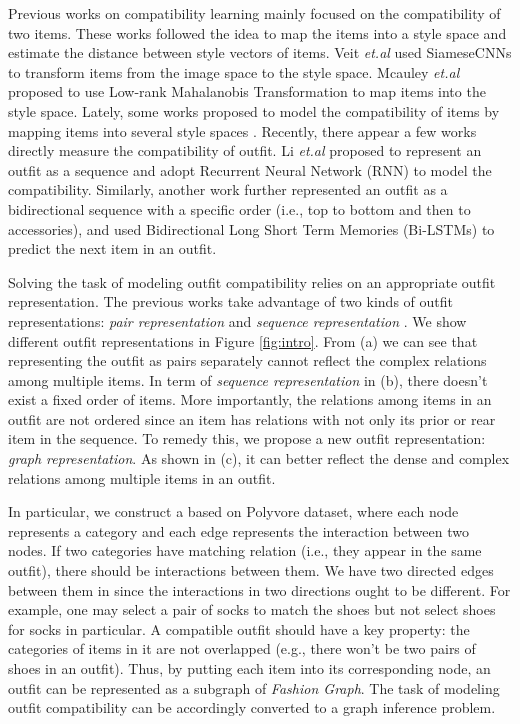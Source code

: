 \documentclass[sigconf]{acmart}
\begin{document}
Previous works on compatibility learning mainly focused on the compatibility of two items. These works followed the idea to map the items into a style space and estimate the distance between style vectors of items.
 Veit \emph{et.al} used SiameseCNNs \cite{veit2015learning,Bell2015Learning} to transform items from the image space to the style space.
Mcauley \emph{et.al} \cite{mcauley2015image} proposed to use Low-rank Mahalanobis Transformation to map items into the style space. Lately, some works proposed to model the compatibility of items by mapping items into several style spaces \cite{he2016learning,shih2018compatibility}.
Recently, there appear a few works directly measure the compatibility of outfit.
Li \emph{et.al} \cite{li2017mining} proposed to represent an outfit as a sequence and adopt Recurrent Neural Network (RNN) \cite{mikolov2010recurrent,mikolov2011extensions,hochreiter1997long,gers1999learning,sundermeyer2012lstm,liu2016predicting,cui2018mv} to model the compatibility.
Similarly, another work \cite{han2017learning} further represented an outfit as a bidirectional sequence with a specific order (i.e., top to bottom and then to accessories), and used Bidirectional Long Short Term Memories (Bi-LSTMs) to predict the next item in an outfit.


Solving the task of modeling outfit compatibility relies on an appropriate outfit representation. The previous works take advantage of two kinds of outfit representations: \emph{pair representation} \cite{veit2015learning,mcauley2015image,he2016learning,shih2018compatibility}
and \emph{sequence representation} \cite{han2017learning}.
We show different outfit representations in Figure \ref{fig:intro}.
From (a) we can see that representing the outfit as pairs separately cannot reflect the complex relations among multiple items.
 In term of \emph{sequence representation} in (b), there doesn't exist a fixed order of items. More importantly, the relations among items in an outfit are not ordered since an item has relations with not only its prior or rear item in the sequence.
To remedy this, we propose a new outfit representation: \emph{graph representation}. As shown in (c), it can better reflect the dense and complex relations among multiple items in an outfit.



In particular, we construct a  based on Polyvore dataset, where each node represents a category and each edge represents the interaction between two nodes. If two categories have matching relation (i.e., they appear in the same outfit), there should be interactions between them. We have two directed edges between them in  since the interactions in two directions ought to be different. For example, one may select a pair of socks to match the shoes but not select shoes for socks in particular.
A compatible outfit should have a key property: the categories of items in it are not overlapped (e.g., there won't be two pairs of shoes in an outfit).
Thus, by putting each item into its corresponding node, an outfit can be represented as a subgraph of \emph{Fashion Graph}.
The task of modeling outfit compatibility can be accordingly converted to a graph inference problem.
\end{document}
